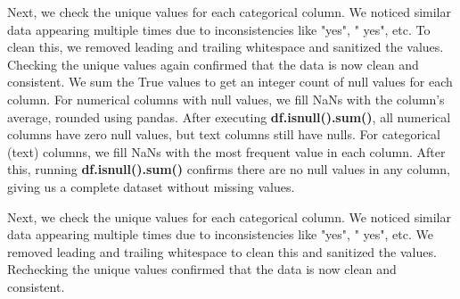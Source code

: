 \documentclass[conference]{IEEEtran}
\begin{document}
Next, we check the unique values for each categorical column. We noticed similar data appearing multiple times due to inconsistencies like "yes", " yes", etc. To clean this, we removed leading and trailing whitespace and sanitized the values. Checking the unique values again confirmed that the data is now clean and consistent. We sum the True values to get an integer count of null values for each column. For numerical columns with null values, we fill NaNs with the column's average, rounded using pandas. After executing \textbf{df.isnull().sum()}, all numerical columns have zero null values, but text columns still have nulls. For categorical (text) columns, we fill NaNs with the most frequent value in each column. After this, running \textbf{df.isnull().sum()} confirms there are no null values in any column, giving us a complete dataset without missing values.

Next, we check the unique values for each categorical column. We noticed similar data appearing multiple times due to inconsistencies like "yes", " yes", etc. We removed leading and trailing whitespace to clean this and sanitized the values. Rechecking the unique values confirmed that the data is now clean and consistent.
\end{document}
